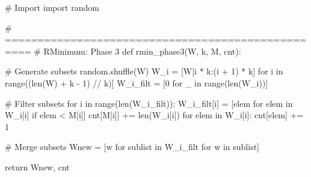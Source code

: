 \begin{python}
#   Import
import random

# ==================================================
#   RMinimum: Phase 3
def rmin_phase3(W, k, M, cnt):

    # Generate subsets
    random.shuffle(W)
    W_i = [W[i * k:(i + 1) * k] 
    		for i in range((len(W) + k - 1) // k)]
    W_i_filt = [0 for _ in range(len(W_i))]

    # Filter subsets
    for i in range(len(W_i_filt)):
        W_i_filt[i] = [elem for elem in W_i[i] if elem < M[i]]
        cnt[M[i]] += len(W_i[i])
        for elem in W_i[i]:
            cnt[elem] += 1

    # Merge subsets
    Wnew = [w for sublist in W_i_filt for w in sublist]

    return Wnew, cnt

\end{python}